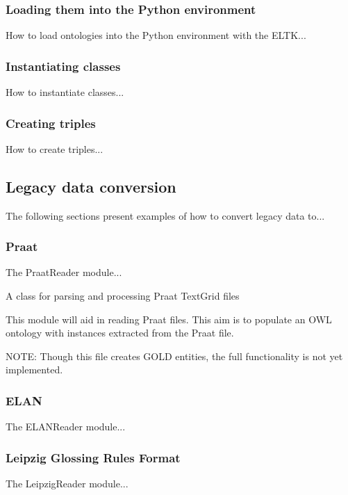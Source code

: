 \documentclass[]{article}
\begin{document}
\subsubsection{Loading them into the Python environment}
How to load ontologies into the Python environment with the ELTK...


\subsubsection{Instantiating classes}
How to instantiate classes...


\subsubsection{Creating triples}
How to create triples...



\subsection{Legacy data conversion}
The following sections present examples of how to convert legacy data to...


\subsubsection{Praat}

The PraatReader module...

A class for parsing and processing Praat TextGrid files 

This module will aid in reading Praat files. This aim is to populate an OWL ontology with instances extracted from the Praat file.                     
                                                                                                                                                       
NOTE:                                                                                                                                                  
Though this file creates GOLD entities, the full functionality is not yet implemented. 



\subsubsection{ELAN}
The ELANReader module...


\subsubsection{Leipzig Glossing Rules Format}
The LeipzigReader module...
 
\end{document}
